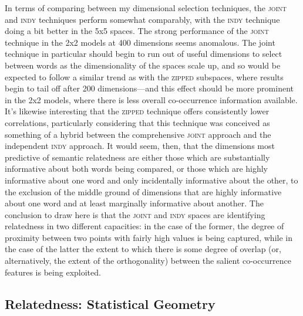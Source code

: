 In terms of comparing between my dimensional selection techniques, the \textsc{joint} and \textsc{indy} techniques perform somewhat comparably, with the \textsc{indy} technique doing a bit better in the 5x5 spaces.  The strong performance of the \textsc{joint} technique in the 2x2 models at 400 dimensions seems anomalous.  The joint technique in particular should begin to run out of useful dimensions to select between words as the dimensionality of the spaces scale up, and so would be expected to follow a similar trend as with the \textsc{zipped} subspaces, where results begin to tail off after 200 dimensions---and this effect should be more prominent in the 2x2 models, where there is less overall co-occurrence information available.  It's likewise interesting that the \textsc{zipped} technique offers consistently lower correlations, particularly considering that this technique was conceived as something of a hybrid between the comprehensive \textsc{joint} approach and the independent \textsc{indy} approach.  It would seem, then, that the dimensions most predictive of semantic relatedness are either those which are substantially informative about both words being compared, or those which are highly informative about one word and only incidentally informative about the other, to the exclusion of the middle ground of dimensions that are highly informative about one word and at least marginally informative about another.  The conclusion to draw here is that the \textsc{joint} and \textsc{indy} spaces are identifying relatedness in two different capacities: in the case of the former, the degree of proximity between two points with fairly high values is being captured, while in the case of the latter the extent to which there is some degree of overlap (or, alternatively, the extent of the orthogonality) between the salient co-occurrence features is being exploited.

\subsection{Relatedness: Statistical Geometry}

